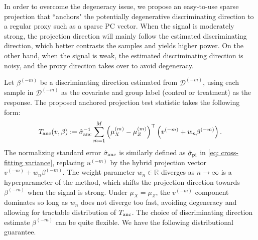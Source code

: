 \documentclass[11pt]{article}
\newtheorem{theorem}{Theorem}[section]
\begin{document}
In order to overcome the degeneracy issue, we propose an easy-to-use sparse projection that ``anchors" the potentially degenerative discriminating direction to a regular proxy such as a sparse PC vector. When the signal is moderately strong, the projection direction will mainly follow the estimated discriminating direction, which better contrasts the samples and yields higher power. On the other hand, when the signal is weak, the estimated discriminating direction is noisy, and the proxy direction takes over to avoid degeneracy.

Let $\beta^{(-m)}$ be a discriminating direction estimated from $\mathcal{D}^{(-m)}$, using each sample in $\mathcal{D}^{(-m)}$ as the covariate and group label (control or treatment) as the response. The proposed anchored projection test statistic takes the following form:
\begin{equation}
\label{eq:Lasso testing statistics}
    T_{\rm anc}(v,\beta) := \hat \sigma_{\rm anc}^{-1}\sum_{m=1}^M \left(\mu_X^{(m)}-\mu_Z^{(m)}\right)^{\top} \left(v^{(-m)}+w_n \beta^{(-m)}\right).
\end{equation}
The normalizing standard error $\hat \sigma_{\rm anc}$ is similarly defined as $\hat \sigma_{\rm pi}$ in \eqref{eq: cross-fitting variance}, replacing $ u^{(-m)}$ by the hybrid projection vector $  v^{(-m)}+w_n \beta^{(-m)}$.
The weight parameter $w_n\in\mathbb{R}$ diverges as $n \rightarrow \infty$ is a hyperparameter of the method, which shifts the projection direction towards $\beta^{(-m)}$ when the signal is strong. Under $\mu_X = \mu_Z$, the $v^{(-m)}$ component dominates so long as $w_n$ does not diverge too fast, avoiding degeneracy and allowing for tractable distribution of $T_{\rm anc}$. The choice of discriminating direction estimate $\beta^{(-m)}$ can be quite flexible.
We have the following distributional guarantee.

\end{document}
